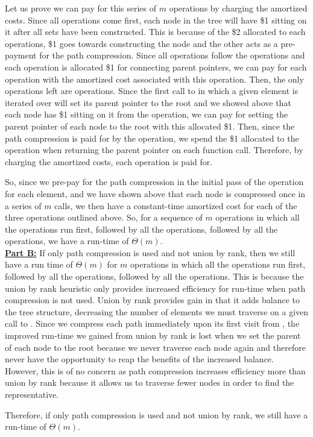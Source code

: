 \documentclass[11pt]{article}
\begin{document}
Let us prove we can pay for this series of $m$ operations by charging the amortized costs. Since all  operations come first, each node in the tree will have \$1 sitting on it after all sets have been constructed. This is because of the \$2 allocated to each  operations, \$1 goes towards constructing the node and the other acts as a pre-payment for the path compression. Since all  operations follow the  operations and each  operation is allocated \$1 for connecting parent pointers, we can pay for each  operation with the amortized cost associated with this operation. Then, the only operations left are  operations. Since the first call to  in which a given element is iterated over will set its parent pointer to the root and we showed above that each node has \$1 sitting on it from the  operation, we can pay for setting the parent pointer of each node to the root with this allocated \$1. Then, since the path compression is paid for by the  operation, we spend the \$1 allocated to the  operation when returning the parent pointer on each function call. Therefore, by charging the amortized costs, each operation is paid for.

So, since we pre-pay for the path compression in the initial pass of the  operation for each element, and we have shown above that each node is compressed once in a series of $m$ calls, we then have a constant-time amortized cost for each of the three operations outlined above. So, for a sequence of $m$ operations in which all the  operations run first, followed by all the  operations, followed by all the  operations, we have a run-time of $\Theta(m)$.\\

\textbf{\underline{Part B:}} If only path compression is used and not union by rank, then we still have a run time of $\Theta(m)$ for $m$ operations in which all the  operations run first, followed by all the  operations, followed by all the  operations. This is because the union by rank heuristic only provides increased efficiency for run-time when path compression is not used. Union by rank provides gain in that it adds balance to the tree structure, decreasing the number of elements we must traverse on a given call to . Since we compress each path immediately upon its first visit from , the improved run-time we gained from union by rank is lost when we set the parent of each node to the root because we never traverse each node again and therefore never have the opportunity to reap the benefits of the increased balance. However, this is of no concern as path compression increases efficiency more than union by rank because it allows us to traverse fewer nodes in order to find the representative.

Therefore, if only path compression is used and not union by rank, we still have a run-time of $\Theta(m)$.

\newpage
\end{document}
